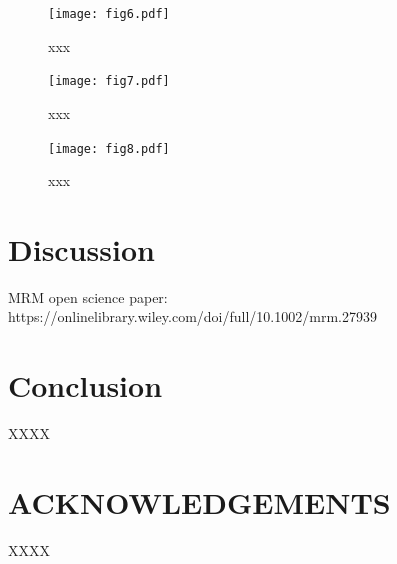 \documentclass[num-refs]{wiley-article}
\begin{document}
\begin{figure}
  \begin{center}
    \texttt{[image: fig6.pdf]}
    \caption{xxx}
    \label{y6}
  \end{center}
\end{figure}

\begin{figure}
  \begin{center}
    \texttt{[image: fig7.pdf]}
    \caption{xxx}
    \label{y7}
  \end{center}
\end{figure}

\begin{figure}
  \begin{center}
    \texttt{[image: fig8.pdf]}
    \caption{xxx}
    \label{y8}
  \end{center}
\end{figure}

\section{Discussion}
MRM open science paper: https://onlinelibrary.wiley.com/doi/full/10.1002/mrm.27939


\cite{Stikov2019}


\cite{OSullivan1986}



\section{Conclusion}
XXXX

\section*{ACKNOWLEDGEMENTS}
XXXX



\clearpage
\listoffigures
\end{document}
